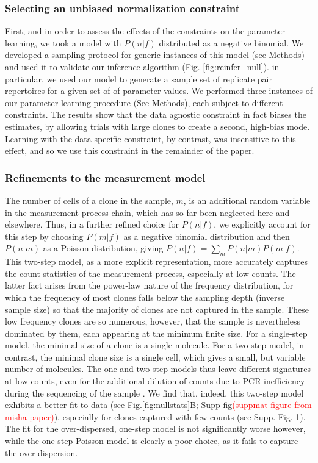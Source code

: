 \documentclass[letterpaper,english,prl,reprint,longbibliography]{revtex4-1} %
\begin{document}
\subsubsection*{Selecting an unbiased normalization constraint}
First, and in order to assess the effects of the constraints on the parameter learning, we took a model with $P(n|f)$ distributed as a negative binomial. We developed a sampling protocol for generic instances of this model (see Methods) and used it to validate our inference algorithm (Fig. \ref{fig:reinfer_null}). in particular, we used our model to generate a sample set of replicate pair repertoires for a given set of of parameter values. We performed three instances of our parameter learning procedure (See Methods), each subject to different constraints. The results show that the data agnostic constraint in fact biases the estimates, by allowing trials with large clones to create a second, high-bias mode. Learning with the data-specific constraint, by contrast, was insensitive to this effect, and so we use this constraint in the remainder of the paper.

\subsubsection*{Refinements to the measurement model}
The number of cells of a clone in the sample, $m$, is an additional random variable in the measurement process chain, which has so far been neglected here and elsewhere. 
Thus, in a further refined choice for $P(n|f)$, we explicitly account for this step by choosing $P(m|f)$ as a negative binomial distribution and then $P(n|m)$ as a Poisson distribution, giving $P(n|f)=\sum_m P(n|m)P(m|f)$. 
This two-step model, as a more explicit representation, more accurately captures the count statistics of the measurement process, especially at low counts. 
The latter fact arises from the power-law nature of the frequency distribution, for which the frequency of most clones falls below the sampling depth (inverse sample size) so that the majority of clones are not captured in the sample. 
These low frequency clones are so numerous, however, that the sample is nevertheless dominated by them, each appearing at the minimum finite size. 
For a single-step model, the minimal size of a clone is a single molecule. 
For a two-step model, in contrast, the minimal clone size is a single cell, which gives a small, but variable number of molecules. 
The one and two-step models thus leave different signatures at low counts, even for the additional dilution of counts due to PCR inefficiency during the sequencing of the sample \citep{Best2015a}.
We find that, indeed, this two-step model exhibits a better fit to data (see Fig.\ref{fig:nullstats}B; Supp fig\textcolor{red}{(suppmat figure from misha paper)}), especially for clones captured with few counts (see Supp. Fig. 1). 
The fit for the over-dispersed, one-step model is not significantly worse however, while the one-step Poisson model is clearly a poor choice, as it fails to capture the over-dispersion. 
\end{document}
